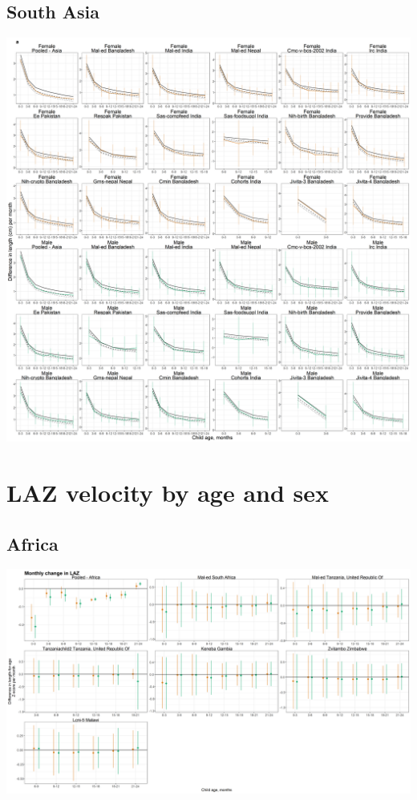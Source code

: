 \documentclass[9pt,]{book}
\begin{document}
\hypertarget{south-asia-3}{%
\subsection{South Asia}\label{south-asia-3}}

\includegraphics[width=75in]{figure-copies/fig-length-2-length_vel-cohort-asia-allage-primary}

\hypertarget{laz-velocity-by-age-and-sex}{%
\section{LAZ velocity by age and sex}\label{laz-velocity-by-age-and-sex}}

\hypertarget{africa-4}{%
\subsection{Africa}\label{africa-4}}

\includegraphics[width=75in]{figure-copies/fig-laz-2-laz_vel-cohort-africa-allage-primary}
\end{document}
